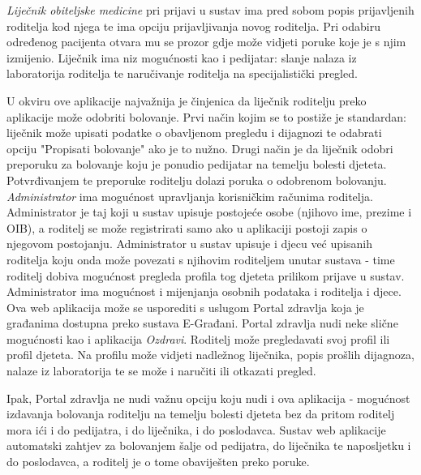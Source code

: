 		
		\textit{Liječnik obiteljske medicine} pri prijavi u sustav ima pred sobom popis prijavljenih roditelja kod njega te ima opciju prijavljivanja novog roditelja. Pri odabiru određenog pacijenta otvara mu se prozor gdje može vidjeti poruke koje je s njim izmijenio. Liječnik ima niz mogućnosti kao i pedijatar: slanje nalaza iz laboratorija roditelja te naručivanje roditelja na specijalistički pregled. 
		
		U okviru ove aplikacije najvažnija je činjenica da liječnik roditelju preko aplikacije može odobriti bolovanje. Prvi način kojim se to postiže je standardan: liječnik može upisati podatke o obavljenom pregledu i dijagnozi te odabrati opciju "Propisati bolovanje" ako je to nužno. Drugi način je da liječnik odobri preporuku za bolovanje koju je ponudio pedijatar na temelju bolesti djeteta. Potvrđivanjem te preporuke roditelju dolazi poruka o odobrenom bolovanju. \\
		
		
		\textit{Administrator} ima mogućnost upravljanja korisničkim računima roditelja. Administrator je taj koji u sustav upisuje postojeće osobe (njihovo ime, prezime i OIB), a roditelj se može registrirati samo ako u aplikaciji postoji zapis o njegovom postojanju. Administrator u sustav upisuje i djecu već upisanih roditelja koju onda može povezati s njihovim roditeljem unutar sustava - time roditelj dobiva mogućnost pregleda profila tog djeteta prilikom prijave u sustav. Administrator ima mogućnost i mijenjanja osobnih podataka i roditelja i djece.\\
		
		
		Ova web aplikacija može se usporediti s uslugom Portal zdravlja koja je građanima dostupna preko sustava E-Građani. Portal zdravlja nudi neke slične mogućnosti kao i aplikacija \textit{Ozdravi}. Roditelj može pregledavati svoj profil ili profil djeteta. Na profilu može vidjeti nadležnog liječnika, popis prošlih dijagnoza, nalaze iz laboratorija te se može i naručiti ili otkazati pregled.
		 
		Ipak, Portal zdravlja ne nudi važnu opciju koju nudi i ova aplikacija - mogućnost izdavanja bolovanja roditelju na temelju bolesti djeteta bez da pritom roditelj mora ići i do pedijatra, i do liječnika, i do poslodavca. Sustav web aplikacije automatski zahtjev za bolovanjem šalje od pedijatra, do liječnika te naposljetku i do poslodavca, a roditelj je o tome obaviješten preko poruke.\\
		
